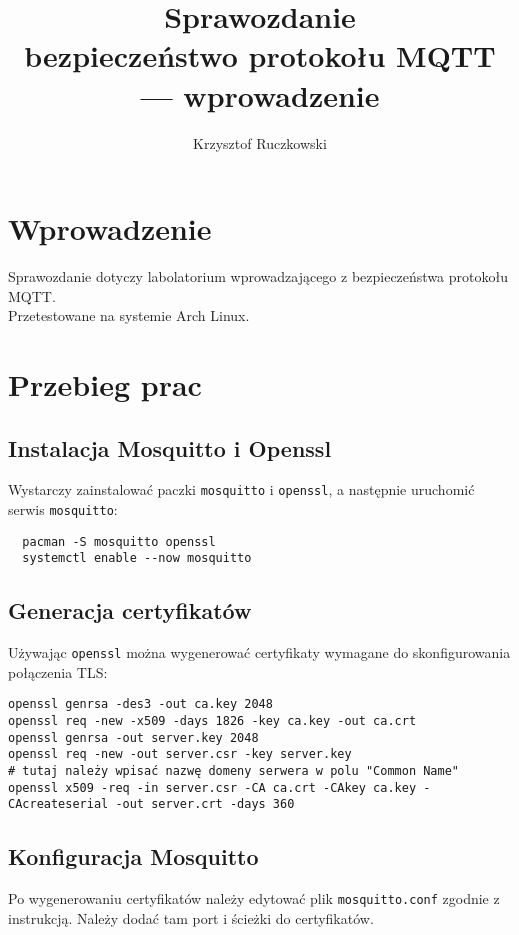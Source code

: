 \documentclass[10pt,a4paper]{article}
\author{Krzysztof Ruczkowski}
\title{Sprawozdanie\\bezpieczeństwo protokołu MQTT --- wprowadzenie}
\begin{document}
\maketitle
\newpage
\tableofcontents
\newpage

\section{Wprowadzenie}

Sprawozdanie dotyczy labolatorium wprowadzającego z bezpieczeństwa protokołu MQTT.
\\
Przetestowane na systemie Arch Linux.

\section{Przebieg prac}

\subsection{Instalacja Mosquitto i Openssl}
Wystarczy zainstalować paczki \texttt{mosquitto} i \texttt{openssl}, a następnie uruchomić serwis \texttt{mosquitto}:

\begin{verbatim}
  pacman -S mosquitto openssl
  systemctl enable --now mosquitto
\end{verbatim}

\subsection{Generacja certyfikatów}
Używając \texttt{openssl} można wygenerować certyfikaty wymagane do skonfigurowania połączenia TLS:

\begin{verbatim}
openssl genrsa -des3 -out ca.key 2048
openssl req -new -x509 -days 1826 -key ca.key -out ca.crt
openssl genrsa -out server.key 2048
openssl req -new -out server.csr -key server.key
# tutaj należy wpisać nazwę domeny serwera w polu "Common Name"
openssl x509 -req -in server.csr -CA ca.crt -CAkey ca.key -CAcreateserial -out server.crt -days 360
\end{verbatim}

\subsection{Konfiguracja Mosquitto}
Po wygenerowaniu certyfikatów należy edytować plik \texttt{mosquitto.conf} zgodnie z instrukcją.
Należy dodać tam port i ścieżki do certyfikatów.
\end{document}
